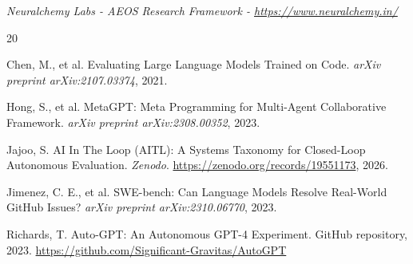 \documentclass[11pt]{article}
\begin{document}
\noindent \emph{Neuralchemy Labs - AEOS Research Framework - \url{https://www.neuralchemy.in/}}


\begin{thebibliography}{20}

Chen, M., et al.
\newblock Evaluating Large Language Models Trained on Code.
\newblock \emph{arXiv preprint arXiv:2107.03374}, 2021.

Hong, S., et al.
\newblock MetaGPT: Meta Programming for Multi-Agent Collaborative Framework.
\newblock \emph{arXiv preprint arXiv:2308.00352}, 2023.

Jajoo, S.
\newblock AI In The Loop (AITL): A Systems Taxonomy for Closed-Loop Autonomous Evaluation.
\newblock \emph{Zenodo}. \url{https://zenodo.org/records/19551173}, 2026.

Jimenez, C. E., et al.
\newblock SWE-bench: Can Language Models Resolve Real-World GitHub Issues?
\newblock \emph{arXiv preprint arXiv:2310.06770}, 2023.

Richards, T.
\newblock Auto-GPT: An Autonomous GPT-4 Experiment.
\newblock GitHub repository, 2023. \url{https://github.com/Significant-Gravitas/AutoGPT}

\end{thebibliography}
\end{document}
